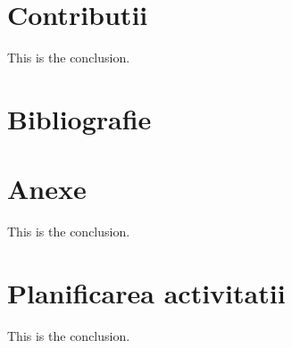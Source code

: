 \documentclass[titlepage]{article}
\begin{document}
\section{Contributii}
This is the conclusion.

\section{Bibliografie}
\printbibliography
\clearpage

\section{Anexe}
This is the conclusion.

\section{Planificarea activitatii}
This is the conclusion.
\end{document}
